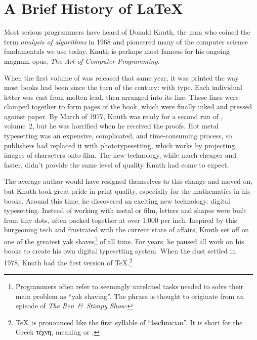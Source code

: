 \chapter{A Brief History of \texorpdfstring{\LaTeX}{LaTeX}}
\label{history}

Most serious programmers have heard of Donald Knuth,
the man who coined the term \emph{analysis of algorithms} in 1968
and pioneered many of the computer science fundamentals we use today.
Knuth is perhaps most famous for his ongoing magnum opus,
\textit{The Art of Computer Programming}.

When the first volume of  was released that same year,
it was printed the way most books had been since the turn of the century:
with  type.
Each individual letter was cast from molten lead,
then arranged into its line.
These lines were clamped together to form pages of the book,
which were finally inked and pressed against paper.
By March of 1977, Knuth was ready for a second run of , volume~2,
but he was horrified when he received the proofs.
Hot metal typesetting was an expensive, complicated, and time-consuming process,
so publishers had replaced it with phototypesetting,
which works by projecting images of characters onto film.
The new technology, while much cheaper and faster,
didn't provide the same level of quality Knuth had come to
expect.\punckern{}

The average author would have resigned themselves to this change and moved on,
but Knuth took great pride in print quality,
especially for the mathematics in his books.
Around this time, he discovered an exciting new technology:
digital typesetting.
Instead of working with metal or film,
letters and shapes were built from tiny dots,
often packed together at over 1,000 per inch.
Inspired by this burgeoning tech and frustrated with the current state of affairs,
Knuth set off on one of the greatest yak shaves\footnote{Programmers
often refer to seemingly unrelated tasks needed to solve their main problem
as ``yak shaving''\quotekern. The phrase is thought to originate from an episode
of \textit{The Ren~\&~Stimpy Show}.}
of all time.
For years, he paused all work on his books to create his own
digital typesetting system.
When the dust settled in 1978, Knuth had the first version of
\TeX.\punckern\footnote{\TeX\ is pronounced like the first syllable of
``\textbf{tech}nician''\quotekern. It is short for the Greek
{τέχνη},
meaning  or .}

